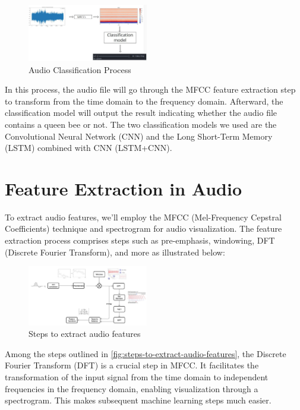 \documentclass[twocolumn]{article}
\begin{document}
\begin{figure}[H]
  \centering
  \includegraphics[width=0.47\textwidth]{Audio-Classification-Process.png}
  \caption{Audio Classification Process}
  \label{fig:audio-classification-process}
\end{figure}

In this process, the audio file will go through the MFCC feature extraction step to
transform from the time domain to the frequency domain. Afterward, the classification
model will output the result indicating whether the audio file contains a queen bee or not.
The two classification models we used are the Convolutional Neural Network (CNN) and the
Long Short-Term Memory (LSTM) combined with CNN (LSTM+CNN).

\section{Feature Extraction in Audio}
To extract audio features, we'll employ the MFCC (Mel-Frequency Cepstral Coefficients)
technique and spectrogram for audio visualization. The feature extraction process comprises
steps such as pre-emphasis, windowing, DFT (Discrete Fourier Transform), and more
\cite{hossan2011novel} as illustrated below:

\begin{figure}[H]
  \centering
  \includegraphics[width=0.47\textwidth]{Steps-to-extract-audio-features.png}
  \caption{Steps to extract audio features}
  \label{fig:steps-to-extract-audio-features}
\end{figure}

Among the steps outlined in \autoref{fig:steps-to-extract-audio-features}, the Discrete Fourier Transform (DFT) is a crucial
step in MFCC. It facilitates the transformation of the input signal from the time domain to
independent frequencies in the frequency domain, enabling visualization through a
spectrogram. This makes subsequent machine learning steps much easier.
\end{document}
